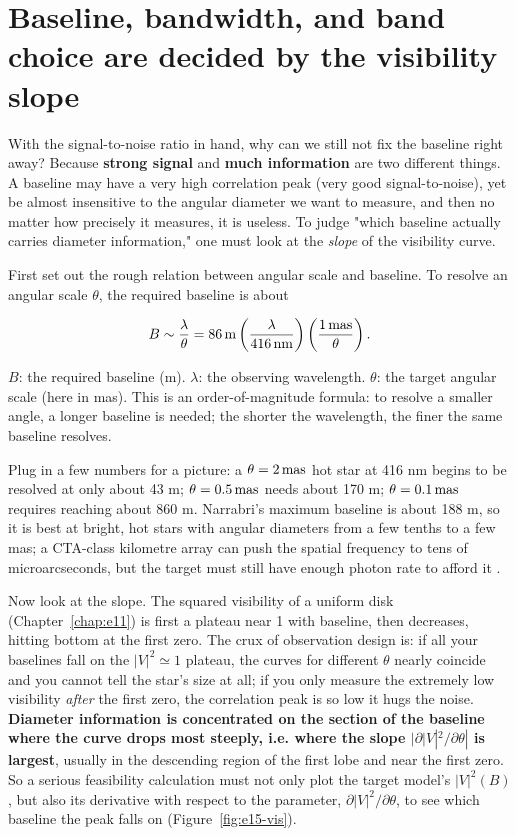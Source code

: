 \section{Baseline, bandwidth, and band choice are decided by the visibility slope}
\label{sec:e15-baseline}

With the signal-to-noise ratio in hand, why can we still not fix the baseline right away? Because \textbf{strong signal} and \textbf{much information} are two different things. A baseline may have a very high correlation peak (very good signal-to-noise), yet be almost insensitive to the angular diameter we want to measure, and then no matter how precisely it measures, it is useless. To judge "which baseline actually carries diameter information," one must look at the \emph{slope} of the visibility curve.

First set out the rough relation between angular scale and baseline. To resolve an angular scale $\theta$, the required baseline is about

\begin{equation}
  B\sim\frac{\lambda}{\theta}
  = 86\,{\rm m}\left(\frac{\lambda}{416\,{\rm nm}}\right)
                \left(\frac{1\,{\rm mas}}{\theta}\right).
  \label{eq:e15-baseline}
\end{equation}
\begin{formulaexplain}
$B$: the required baseline (m). $\lambda$: the observing wavelength. $\theta$: the target angular scale (here in mas). This is an order-of-magnitude formula: to resolve a smaller angle, a longer baseline is needed; the shorter the wavelength, the finer the same baseline resolves.
\end{formulaexplain}

Plug in a few numbers for a picture: a $\theta=2\,{\rm mas}$ hot star at 416 nm begins to be resolved at only about 43 m; $\theta=0.5\,{\rm mas}$ needs about 170 m; $\theta=0.1\,{\rm mas}$ requires reaching about 860 m. Narrabri's maximum baseline is about 188 m, so it is best at bright, hot stars with angular diameters from a few tenths to a few mas; a CTA-class kilometre array can push the spatial frequency to tens of microarcseconds, but the target must still have enough photon rate to afford it \citep{1974MNRAS.167..121H,2006ApJ...649..399L}.

Now look at the slope. The squared visibility of a uniform disk (Chapter~\ref{chap:e11}) is first a plateau near 1 with baseline, then decreases, hitting bottom at the first zero. The crux of observation design is: if all your baselines fall on the $|V|^2\simeq1$ plateau, the curves for different $\theta$ nearly coincide and you cannot tell the star's size at all; if you only measure the extremely low visibility \emph{after} the first zero, the correlation peak is so low it hugs the noise. \textbf{Diameter information is concentrated on the section of the baseline where the curve drops most steeply, i.e. where the slope $|\partial|V|^2/\partial\theta|$ is largest}, usually in the descending region of the first lobe and near the first zero. So a serious feasibility calculation must not only plot the target model's $|V|^2(B)$, but also its derivative with respect to the parameter, $\partial|V|^2/\partial\theta$, to see which baseline the peak falls on (Figure~\ref{fig:e15-vis}).


